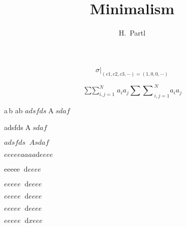 \documentclass[UTF8]{article}
\author{H.~Partl}
\title{Minimalism}
\begin{document}
\begin{equation}
{\sigma |}_{(c1,c2,c3,\cdots)=(1,0,0,\cdots)}
\end{equation}

\begin{displaymath}
\mathop{\sum \sum}_{i,j=1}^{N} a_i a_j 
{\sum \sum}_{i,j=1}^{N} a_i a_j
\end{displaymath}

a\,b
a\!b
$adsfds\mathop{A}sdaf$

adsfds$\mathop{A}sdaf$

$adsfds\mathop{}Asdaf$

$eeeeeaaaa\!\mathrm{d}eeee$

eeeee$\mathop{}\!\mathrm{d}eeee$

$eeeee\mathop{}\!\mathrm{d}eeee$

$eeeee\mathop{} \mathrm{d}eeee$

$eeeee\mathop{}\mathrm{d}\!eeee$

$eeeee\mathop{}\mathrm{d}\!xeee$
\end{document}
